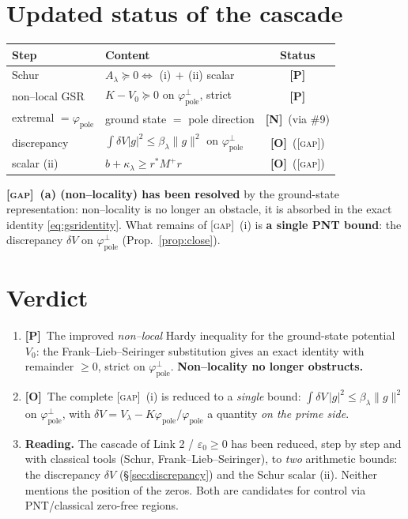 \documentclass[11pt]{article}
\newcommand{\PR}{\textcolor{green!55!black}{\textbf{[P]}}}
\newcommand{\NM}{\textcolor{blue!70!black}{\textbf{[N]}}}
\newcommand{\OP}{\textcolor{red!75!black}{\textbf{[O]}}}
\newcommand{\GAP}{\textcolor{red!75!black}{\textsc{[gap]}}}
\theoremstyle{plain}
\theoremstyle{definition}
\newcommand{\kin}{K}
\newcommand{\vv}{V}
\newcommand{\fp}{\varphi_{\mathrm{pole}}}
\begin{document}
\section{Updated status of the cascade}\label{sec:cascade}

\begin{center}
\renewcommand{\arraystretch}{1.35}
\begin{tabular}{l l c}
\hline
\textbf{Step} & \textbf{Content} & \textbf{Status}\\\hline
Schur & $A_\lambda\succeq0\Leftrightarrow$ (i)$\,+\,$(ii) scalar & \PR\\
non--local GSR & $\kin-\vv_0\succeq0$ on $\fp^\perp$, strict & \PR\\
extremal $=\fp$ & ground state $=$ pole direction & \NM\ (via \#9)\\
discrepancy & $\int\delta\vv|g|^2\le\beta_\lambda\|g\|^2$ on $\fp^\perp$ & \OP\ (\GAP)\\
scalar (ii) & $b+\kappa_\lambda\ge r^*M^+r$ & \OP\ (\GAP)\\\hline
\end{tabular}
\end{center}

\noindent\textbf{\GAP\ (a) (non--locality) has been resolved} by the ground-state
representation: non--locality is no longer an obstacle, it is absorbed in the
exact identity \eqref{eq:gsridentity}. What remains of \GAP\ (i) is \textbf{a single
PNT bound}: the discrepancy $\delta\vv$ on $\fp^\perp$ (Prop.\ \ref{prop:close}).

\section{Verdict}\label{sec:verdict}

\begin{enumerate}[leftmargin=1.6em]
\item \PR\ The improved \emph{non--local} Hardy inequality for the ground-state
potential $\vv_0$: the Frank--Lieb--Seiringer substitution gives an exact identity
with remainder $\ge0$, strict on $\fp^\perp$. \textbf{Non--locality no longer
obstructs.}
\item \OP\ The complete \GAP\ (i) is reduced to a \emph{single} bound:
$\int\delta\vv\,|g|^2\le\beta_\lambda\|g\|^2$ on $\fp^\perp$, with
$\delta\vv=\vv_\lambda-\kin\fp/\fp$ a quantity \emph{on the prime side}.
\item \textbf{Reading.} The cascade of Link 2 / $\varepsilon_0\ge0$ has been reduced,
step by step and with classical tools (Schur, Frank--Lieb--Seiringer), to
\emph{two} arithmetic bounds: the discrepancy $\delta\vv$ (\S\ref{sec:discrepancy}) and
the Schur scalar (ii). Neither mentions the position of the zeros. Both are
candidates for control via PNT/classical zero-free regions.
\end{enumerate}
\end{document}
